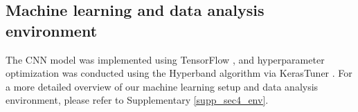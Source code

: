 \subsection{Machine learning and data analysis environment}
The CNN model was implemented using TensorFlow \cite{abadi2016tensorflow}, and hyperparameter optimization was conducted using the Hyperband \cite{li2018hyperband} algorithm via KerasTuner \cite{omalley2019kerastuner}.
For a more detailed overview of our machine learning setup and data analysis environment, please refer to Supplementary \cref{supp_sec4_env}.
